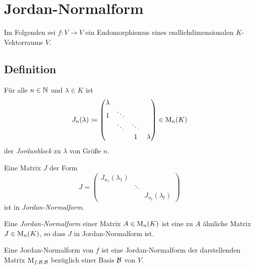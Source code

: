 \section{Jordan-Normalform}

Im Folgenden sei $f \colon V \to V$ ein Endomorphismus eines endlichdimensionalen $K$-Vek\-tor\-raums $V$.





\subsection{Definition}

\begin{definition}
  Für alle $n \in \mathbb{N}$ und $\lambda \in K$ ist
  \[
              J_n(\lambda)
    \coloneqq \begin{pmatrix}
                \lambda &         &         &         \\
                1       & \ddots  &         &         \\
                        & \ddots  & \ddots  &         \\
                        &         & 1       & \lambda
              \end{pmatrix}
    \in       \operatorname{M}_{n}(K)
  \]
  der \emph{Jordanblock} zu $\lambda$ von Größe $n$.
\end{definition}

\begin{definition}
  Eine Matrix $J$ der Form
  \[
      J
    = \begin{pmatrix}
        J_{n_1}(\lambda_1)  &         &                     \\
                            & \ddots  &                     \\
                            &         & J_{n_t}(\lambda_t)
      \end{pmatrix}
  \]
  ist in \emph{Jordan-Normalform}.
\end{definition}

\begin{definition}
  Eine \emph{Jordan-Normalform} einer Matrix $A \in \operatorname{M}_{n}(K)$ ist eine zu $A$ ähnliche Matrix $J \in \operatorname{M}_{n}(K)$, so dass $J$ in Jordan-Normalform ist.
  
  Eine Jordan-Normalform von $f$ ist eine Jordan-Normalform der darstellenden Matrix $\operatorname{M}_{f, \mathcal{B}, \mathcal{B}}$ bezüglich einer Basis $\mathcal{B}$ von $V$.
\end{definition}

